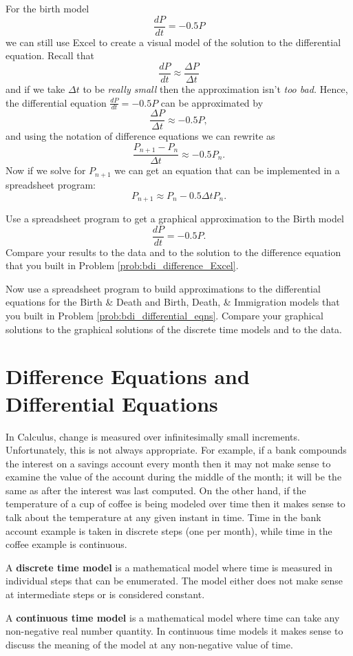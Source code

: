 For the birth model
\[ \frac{dP}{dt} = -0.5P \]
we can still use Excel to create a visual model of the solution to the differential
equation.  Recall that 
\[ \frac{dP}{dt} \approx \frac{\Delta P}{\Delta t} \]
and if we take $\Delta t$ to be {\it really small} then the approximation isn't {\it too
bad.}  Hence, the differential equation $\frac{dP}{dt} = -0.5 P$ can be approximated by
\[ \frac{\Delta P}{\Delta t} \approx -0.5 P, \]
and using the notation of difference equations we can rewrite as
\[ \frac{P_{n+1} - P_n}{\Delta t} \approx -0.5 P_n. \]
Now if we solve for $P_{n+1}$ we can get an equation that can be implemented in a
spreadsheet program:
\[ P_{n+1} \approx P_n - 0.5 \Delta t P_n. \]

\begin{problem}
    Use a spreadsheet program to get a graphical approximation to the Birth model
    \[ \frac{dP}{dt} = -0.5P. \]
    Compare your results to the data and to the solution to the difference equation that
    you built in Problem \ref{prob:bdi_difference_Excel}.
\end{problem}

\begin{problem}
    Now use a spreadsheet program to build approximations to the differential equations
    for the Birth \& Death and Birth, Death, \& Immigration models that you built in
    Problem \ref{prob:bdi_differential_eqns}.  Compare your graphical solutions to the
    graphical solutions of the discrete time models and to the data.
\end{problem}

\newpage\section{Difference Equations and Differential Equations}
In Calculus, change is measured over infinitesimally small increments.  Unfortunately, this
is not always appropriate.  For example, if a bank compounds the interest on a savings
account every month then it may not make sense to examine the value of the account during
the middle of the month; it will be the same as after the interest was last computed.  On
the other hand, if the temperature of a cup of coffee is being modeled over time then it
makes sense to talk about the temperature at any given instant in time.  Time in the bank account
example is taken in discrete steps (one per month), while time in the coffee example is
continuous.

\begin{definition}
    A {\bf discrete time model} is a mathematical model where time is measured in
    individual steps that can be enumerated.  The model either does not make sense at
    intermediate steps or is considered constant.
\end{definition}
\begin{definition}
    A {\bf continuous time model} is a mathematical model where time can take any
    non-negative real number quantity.  In continuous time models it makes sense to
    discuss the meaning of the model at any non-negative value of time.
\end{definition}

